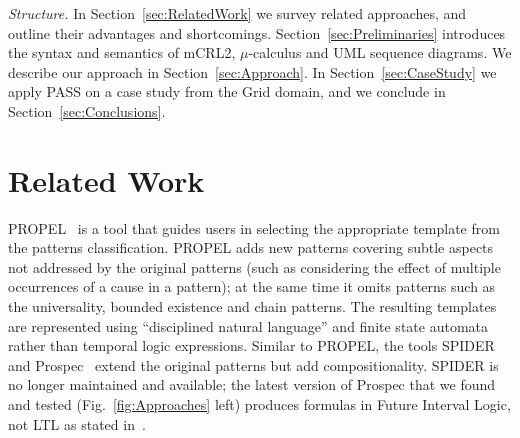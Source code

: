 \documentclass[letter]{llncs}
\begin{document}
\noindent\emph{Structure.}
In Section~\ref{sec:RelatedWork} we
survey related approaches,
and outline their advantages and
shortcomings. Section~\ref{sec:Preliminaries} introduces
the syntax and semantics of mCRL2, $\mu$-calculus and UML sequence
diagrams. We describe our approach in Section~\ref{sec:Approach}.
In Section~\ref{sec:CaseStudy} we apply PASS on a case study from the
Grid domain, and we conclude in Section~\ref{sec:Conclusions}.
\vspace{-7 pt}

\section{Related Work}
\vspace{-7 pt}

\label{sec:RelatedWork}
PROPEL~\cite{Smith02propel:an} is a tool that
guides users in selecting the appropriate template from the patterns
classification. PROPEL adds new patterns covering subtle aspects
not addressed by the original patterns (such as considering the effect
of multiple occurrences of a cause in a pattern); at the same time it
omits patterns such as the universality, bounded
existence and chain patterns. The resulting templates are represented
using ``disciplined natural language'' and finite state automata rather
than temporal logic expressions.
%
Similar to PROPEL, the tools SPIDER~\cite{konrad2005facilitating}
and Prospec~\cite{Mondragon_prospec} extend the original patterns but
add compositionality.  SPIDER is no longer maintained and
available; the latest version of Prospec that we found and tested
(Fig.~\ref{fig:Approaches} left) produces formulas in Future Interval
Logic, not LTL as stated in~\cite{Mondragon_prospec}.
\end{document}
